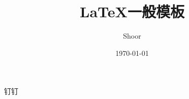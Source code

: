 \documentclass{article}
\title{\LaTeX 一般模板}
\author{Shoor}
\date{\today}
\begin{document}
\section{}
钉钉
\end{document}
